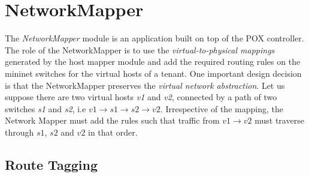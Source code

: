 \section{NetworkMapper}
The \emph{NetworkMapper} module is an application built on top of the POX controller. The role of the NetworkMapper is to use the \emph{virtual-to-physical mappings} generated by the host mapper module and add the required routing rules on the mininet switches for the virtual hosts of a tenant. One important design decision is that the NetworkMapper preserves the \emph{virtual network abstraction}. Let us suppose there are two virtual hosts \emph{v1} and \emph{v2}, connected by a path of two switches \emph{s1} and \emph{s2}, i.e $v1 \rightarrow s1 \rightarrow s2 \rightarrow v2 $.  Irrespective of the mapping, the Network Mapper must add the rules such that traffic from $v1 \rightarrow v2 $ must traverse through $s1$, $s2 $ and $v2$ in that order. 

\subsection{Route Tagging}




 

